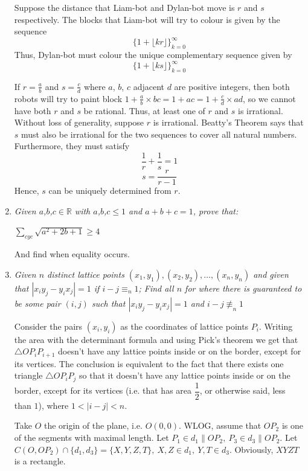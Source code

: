 \documentclass{article}
\begin{document}
\begin{enumerate}
Suppose the distance that Liam-bot and Dylan-bot move is $r$ and $s$ respectively. The blocks that Liam-bot will try to colour is given by the sequence
$$\{1 + \lfloor kr \rfloor\}_{k=0}^{\infty} $$
Thus, Dylan-bot must colour the unique complementary sequence given by
$$\{1 + \lfloor ks \rfloor\}_{k=0}^{\infty} $$

If $r = \frac{a}{b}$ and $s = \frac{c}{d}$ where $a$, $b$, $c$ adjacent $d$ are positive integers, then both robots will try to paint block $1 + \frac{a}{b} \times bc = 1 + ac = 1 + \frac{c}{d} \times ad$, so we cannot have both $r$ and $s$ be rational. Thus, at least one of $r$ and $s$ is irrational. Without loss of generality, suppose $r$ is irrational. Beatty's Theorem says that $s$ must also be irrational for the two sequences to cover all natural numbers. Furthermore, they must satisfy
$$\frac{1}{r} + \frac{1}{s} = 1$$
$$ s = \frac{r}{r - 1}$$
Hence, $s$ can be uniquely determined from $r$.


\medskip
\item %
{\itshape 
Given $a$,$b$,$c\in\mathbb{R}$ with $a$,$b$,$c\leq 1$ and $a+b+c = 1$, prove that:
\begin{center}
   $\sum_{cyc} \sqrt{a^2+2b+1}\geq 4$ 
\end{center}
And find when equality occurs.}


\medskip
\item %
{\itshape Given $n$ distinct lattice points $(x_1,y_1),(x_2,y_2),\ldots,(x_n,y_n)$ and given that $|x_iy_{j}-y_ix_{j}| = 1$ if $i-j\equiv_n 1$;
Find all $n$ for where there is guaranteed to be some pair $(i,j)$ such that $|x_iy_{j}-y_ix_{j}| = 1$ and $i-j\not\equiv_n 1$
}

Consider the pairs $(x_i,y_i)$ as the coordinates of lattice points $P_i$. Writing the area with the determinant formula and using Pick's theorem we get that $\triangle{OP_iP_{i+1}}$ doesn't have any lattice points inside or on the border, except for its vertices.
The conclusion is equivalent to the fact that there exists one triangle $\triangle{OP_iP_j}$ so that it doesn't have any lattice points inside or on the border, except for its vertices (i.e. that has area $\dfrac{1}{2}$, or otherwise said, less than $1$), where $1<|i-j|<n$.

Take $O$ the origin of the plane, i.e. $O(0,0)$. WLOG, assume that $OP_2$ is one of the segments with maximal length. Let $P_1\in d_1\parallel OP_2,\ P_3\in d_3\parallel OP_2$. Let $C(O,OP_2)\cap \{ d_1,d_3\}=\{X,Y,Z,T\},\ X,Z\in d_1,\ Y,T\in d_3$. Obviously, $XYZT$ is a rectangle.


\end{enumerate}
\end{document}
